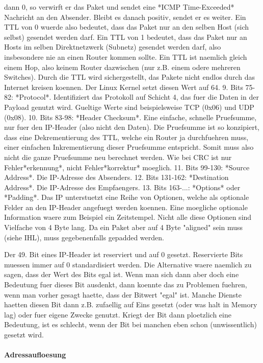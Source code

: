    dann 0, so verwirft er das Paket und sendet eine *ICMP Time-Exceeded*
   Nachricht an den Absender. Bleibt es danach positiv, sendet er es weiter. Ein
   TTL von 0 wuerde also bedeutet, dass das Paket nur an den selben Host (sich
   selbst) gesendet werden darf. Ein TTL von 1 bedeutet, dass das Paket nur an
   Hosts im selben Direktnetzwerk (Subnetz) gesendet werden darf, also
   insbesondere nie an einen Router kommen sollte. Ein TTL ist naemlich gleich
   einem Hop, also keinem Router dazwischen (nur z.B. einem odere mehreren
   Switches). Durch die TTL wird sichergestellt, das Pakete nicht endlos durch
   das Internet kreisen koennen. Der Linux Kernel setzt diesen Wert auf 64.
9. Bits 75-82: *Protocol*. Identifiziert das Protokoll auf Schicht 4, das fuer
   die Daten in der Payload genutzt wird. Gueltige Werte sind beispielsweise TCP
   (0x06) und UDP (0x08).
10. Bits 83-98: *Header Checksum*. Eine einfache, schnelle Pruefsumme, nur fuer
    den IP-Header (also nicht den Daten). Die Pruefsumme ist so konzipiert, dass
    eine Dekrementierung des TTL, welche ein Router ja durchfuehren muss, einer
    einfachen Inkrementierung dieser Pruefsumme entspricht. Somit muss also
    nicht die ganze Pruefsumme neu berechnet werden. Wie bei CRC ist nur
    Fehler*erkennung*, nicht Fehler*korrektur* moeglich.
11. Bits 99-130: *Source Address*. Die IP-Adresse des Absenders.
12. Bits 131-162: *Destination Address*. Die IP-Adresse des Empfaengers.
13. Bits 163-...: *Options* oder *Padding*. Das IP unterstuetzt eine Reihe von
    Optionen, welche als optionale Felder an den IP-Header angefuegt werden
    koennen. Eine moegliche optionale Information waere zum Beispiel ein
    Zeitstempel. Nicht alle diese Optionen sind Vielfache von 4 Byte lang. Da
    ein Paket aber auf 4 Byte "aligned" sein muss (siehe IHL), muss
    gegebenenfalls gepadded werden.

Der 49. Bit eines IP-Header ist reserviert und auf 0 gesetzt. Reservierte Bits
muessen immer auf 0 standardisiert werden. Die Alternative waere naemlich zu
sagen, dass der Wert des Bits egal ist. Wenn man sich dann aber doch eine
Bedeutung fuer dieses Bit ausdenkt, dann koennte das zu Problemen fuehren, wenn
man vorher gesagt haette, dass der Bitwert "egal" ist. Manche Dienste haetten
diesen Bit dann z.B. zufaellig auf Eins gesetzt (oder was halt in Memory lag)
oder fuer eigene Zwecke genutzt. Kriegt der Bit dann ploetzlich eine Bedeutung,
ist es schlecht, wenn der Bit bei manchen eben schon (unwissentlich) gesetzt
wird.

\paragraph{Adressaufloesung} 

